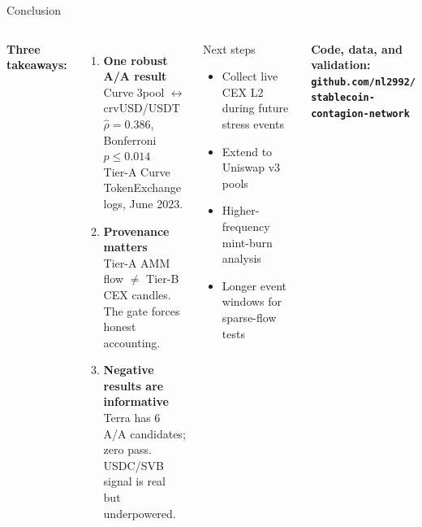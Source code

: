 \documentclass[aspectratio=169,11pt]{beamer}
\begin{document}
\begin{frame}{Conclusion}
\begin{columns}[T]
\textbf{Three takeaways:}
\begin{enumerate}
  \item \textbf{One robust A/A result}\\
    Curve 3pool $\leftrightarrow$ crvUSD/USDT\\
    $\hat{\rho}=0.386$, Bonferroni $p\le0.014$\\
    Tier-A Curve TokenExchange logs, June 2023.
  \vspace{4pt}
  \item \textbf{Provenance matters}\\
    Tier-A AMM flow $\neq$ Tier-B CEX candles.\\
    The gate forces honest accounting.
  \vspace{4pt}
  \item \textbf{Negative results are informative}\\
    Terra has 6 A/A candidates; zero pass.\\
    USDC/SVB signal is real but underpowered.
\end{enumerate}
\begin{block}{Next steps}
\begin{itemize}
  \item Collect live CEX L2 during future stress events
  \item Extend to Uniswap v3 pools
  \item Higher-frequency mint-burn analysis
  \item Longer event windows for sparse-flow tests
\end{itemize}
\end{block}
\vspace{8pt}
\centering
\textbf{\color{cuamber} Code, data, and validation:\\
\texttt{github.com/nl2992/\\stablecoin-contagion-network}}
\end{columns}
\end{frame}
\end{document}
